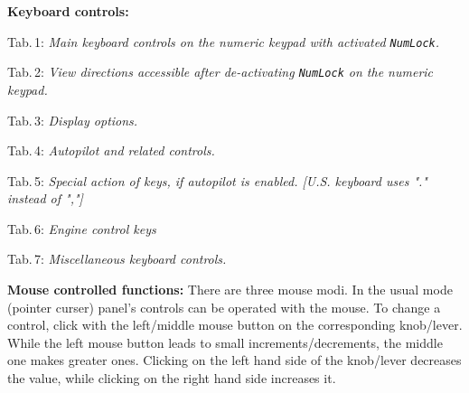 \documentclass[10pt]{article}
\begin{document}
 \noindent
 \textbf{Keyboard controls:}
\begin{multicols}{2}
 \noindent
 Tab.\,1: \textit{Main keyboard controls on the numeric keypad with
 activated \texttt{NumLock}.}\\

\noindent

\bigskip

 \noindent
 Tab.\,2: \textit{View directions accessible after de-activating \texttt{NumLock} on the numeric keypad.}
\medskip

 \noindent
 
\bigskip

 \noindent
 Tab.\,3: \textit{Display options.}
\medskip

 \noindent

\bigskip
\rule{0mm}{15mm}

 \noindent
 Tab.\,4: \textit{Autopilot and related controls.}
\medskip

\noindent

\medskip

 \noindent
Tab.\,5: \textit{Special action of keys, if autopilot is enabled.
[U.S. keyboard uses "." instead of ","]}
\medskip

 \noindent

\medskip


 \noindent
Tab.\,6: \textit{Engine control keys}
\medskip

 \noindent

\medskip

 \noindent
Tab.\,7: \textit{Miscellaneous keyboard controls.}
\medskip

 \noindent

\medskip


\end{multicols}

 \noindent
 \textbf{Mouse controlled functions:}
 There are three mouse modi. In the usual mode (pointer curser) panel's controls can be operated
 with the mouse. To change a control, click with the left/middle mouse button on the
 corresponding knob/lever. While the left mouse button leads to small increments/decrements,
 the middle one makes greater ones. Clicking on the left hand side of the knob/lever
 decreases the value, while clicking on the right hand side increases it.
\end{document}
